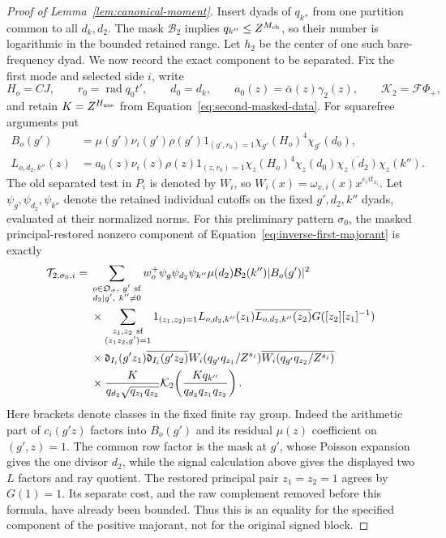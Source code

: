 \documentclass[12pt]{article}
\begin{document}
\begin{proof}[Proof of Lemma~\ref{lem:canonical-moment}]
Insert dyads of \(q_{k''}\) from one partition common to all \(d_k,d_2\).
The mask \(\mathcal B_2\) implies \(q_{k''}\le Z^{M_{\rm ch}}\), so their
number is logarithmic in the bounded retained range.  Let \(h_2\) be
the center of one such bare-frequency dyad.  We now record the exact
component to be separated.  Fix the first mode and selected side \(i\),
write
\[
 H_o=CJ,\qquad r_0=\operatorname{rad}q_0t',\qquad d_0=d_k,
 \qquad a_0(z)=\bar\alpha(z)\gamma_2(z),\qquad
 \mathcal K_2=\mathcal F\Phi_+,
\]
and retain \(K=Z^{H_{\rm use}}\) from
Equation~\eqref{eq:second-masked-data}.  For squarefree arguments put
\begin{equation}\label{eq:inverse-second-outer-coefficients}
 \begin{split}
 B_o(g')&=\mu(g')\nu_i(g')\rho(g')1_{(g',r_0)=1}
              \chi_{g'}(H_o)^4\chi_{g'}(d_0),\\
 L_{o,d_2,k''}(z)&=a_0(z)\nu_i(z)\rho(z)1_{(z,r_0)=1}
       \chi_z(H_o)^4\chi_z(d_0)\overline{\chi_z(d_2)}\chi_z(k'').
 \end{split}
\end{equation}
The old separated test in \(P_i\) is denoted by \(W_i\), so
\(W_i(x)=\omega_{x,i}(x)x^{\varepsilon_iit_{x_i}}\).
Let \(\psi_g,\psi_{d_2},\psi_{k''}\) denote the retained individual
cutoffs on the fixed \(g',d_2,k''\) dyads, evaluated at their normalized
norms.  For this preliminary pattern \(\sigma_0\), the masked
principal-restored nonzero component of
Equation~\eqref{eq:inverse-first-majorant} is exactly
\begin{equation}\label{eq:inverse-second-formal-component}
 \begin{split}
 \mathcal T_{2,\sigma_0,i}={}&
 \sum_{\substack{o\in\mathfrak O_\sigma,\ g'\ {\rm sf}\\d_2\mid g',\ k''\ne0}}
 w_o^+\psi_g\psi_{d_2}\psi_{k''}\mu(d_2)\mathcal B_2(k'')|B_o(g')|^2\\
 &\times\sum_{\substack{z_1,z_2\ {\rm sf}\\(z_1z_2,g')=1}}
 1_{(z_1,z_2)=1}L_{o,d_2,k''}(z_1)\overline{L_{o,d_2,k''}(z_2)}
       G([z_2][z_1]^{-1})\\
 &\times\mathfrak d_{I_i}(g'z_1)\overline{\mathfrak d_{I_i}(g'z_2)}
       W_i(q_{g'}q_{z_1}/Z^{s_i})
       \overline{W_i(q_{g'}q_{z_2}/Z^{s_i})}\\
 &\times\frac{K}{q_{d_2}\sqrt{q_{z_1}q_{z_2}}}
       \mathcal K_2\!\left(\frac{Kq_{k''}}{q_{d_2}q_{z_1}q_{z_2}}\right).
 \end{split}
\end{equation}
Here brackets denote classes in the fixed finite ray group.  Indeed the
arithmetic part of \(c_i(g'z)\) factors into \(B_o(g')\) and its
residual \(\mu(z)\) coefficient on \((g',z)=1\).  The common row factor
is the mask at \(g'\), whose Poisson expansion gives the one divisor
\(d_2\), while the signal calculation above gives the displayed two
\(L\) factors and ray quotient.  The restored principal pair
\(z_1=z_2=1\) agrees by \(G(1)=1\).  Its separate cost, and the raw
complement removed before this formula, have already been bounded.
Thus this is an equality for the specified component of the positive
majorant, not for the original signed block.


\end{proof}
\end{document}
